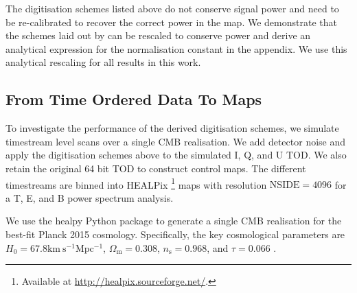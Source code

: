 \documentclass[apj]{emulateapj}
\begin{document}
The digitisation schemes listed above do not conserve signal power and need to be re-calibrated to recover the correct power in the map. We demonstrate that the schemes laid out by \cite{max1960} can be rescaled to conserve power and derive an analytical expression for the normalisation constant in the appendix. We use this analytical rescaling for all results in this work.




\subsection{From Time Ordered Data To Maps}
\label{subsec:method}

To investigate the performance of the derived digitisation schemes, we simulate timestream level scans over a single CMB realisation. We add detector noise and apply the digitisation schemes above to the simulated I, Q, and U TOD. We also retain the original 64 bit TOD to construct control maps. The different timestreams are binned into HEALPix \citep{healpix}\footnote{Available at \url{http://healpix.sourceforge.net/}.} maps with resolution $\mathrm{NSIDE} = 4096$ for a T, E, and B power spectrum analysis.


We use the healpy Python package to generate a single CMB realisation for the best-fit Planck 2015 cosmology. Specifically, the key cosmological parameters are $H_0 = 67.8 \mathrm{km \> s^{-1} Mpc^{-1}}$, $\Omega_{\mathrm{m}} = 0.308 $, $n_{\mathrm{s}} = 0.968$, and $\tau = 0.066$ \citep{planck2016}.
\end{document}
